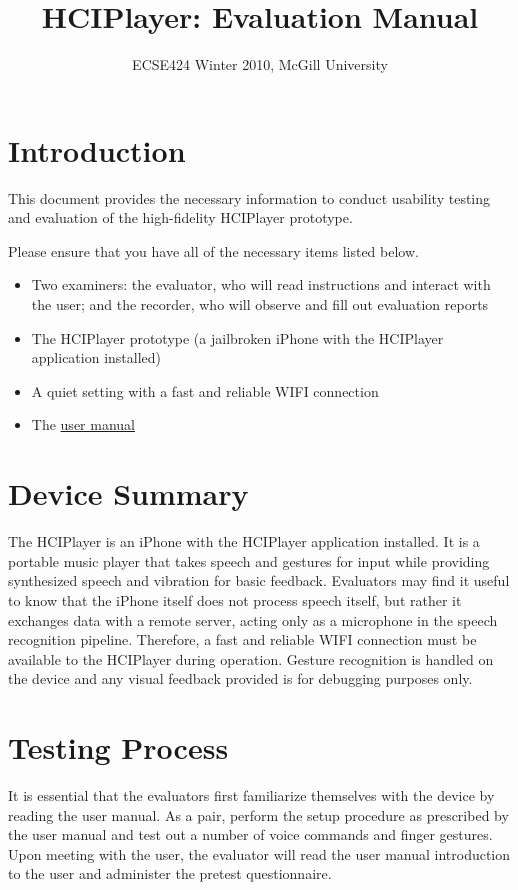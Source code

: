 \documentclass[12pt,letterpaper]{article}
\begin{document}
\title{HCIPlayer: Evaluation Manual}
\author{ECSE424 Winter 2010, McGill University}
\renewcommand{\today}{Updated: Monday, March 8th, 2010}
\maketitle

\section{Introduction}

This document provides the necessary information to conduct usability testing and evaluation of the high-fidelity HCIPlayer prototype.

Please ensure that you have all of the necessary items listed below.

\begin{itemize}
\item Two examiners: the evaluator, who will read instructions and interact with the user; and the recorder, who will observe and fill out evaluation reports
\item The HCIPlayer prototype (a jailbroken iPhone with the HCIPlayer application installed)
\item A quiet setting with a fast and reliable WIFI connection
\item The \href{http://www.ece.mcgill.ca/~scormi3/hci/docs/user-manual.pdf}{user manual}
\end{itemize}

\section{Device Summary}
The HCIPlayer is an iPhone with the HCIPlayer application installed. It is a portable music player that takes speech and gestures for input while providing synthesized speech and vibration for basic feedback. Evaluators may find it useful to know that the iPhone itself does not process speech itself, but rather it exchanges data with a remote server, acting only as a microphone in the speech recognition pipeline. Therefore, a fast and reliable WIFI connection must be available to the HCIPlayer during operation. Gesture recognition is handled on the device and any visual feedback provided is for debugging purposes only. 

\section{Testing Process}
It is essential that the evaluators first familiarize themselves with the device by reading the user manual. As a pair, perform the setup procedure as prescribed by the user manual and test out a number of voice commands and finger gestures. Upon meeting with the user, the evaluator will read the user manual introduction to the user and administer the pretest questionnaire.
\end{document}
